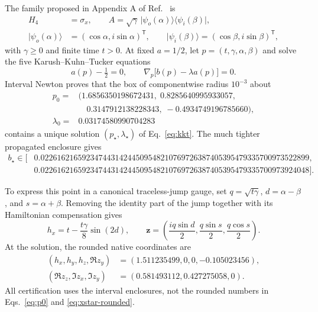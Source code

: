 \documentclass[11pt,a4paper]{article}
\newcommand{\ket}[1]{\lvert #1\rangle}
\newcommand{\bra}[1]{\langle #1\rvert}
\begin{document}
The family proposed in Appendix A of Ref.~\cite{Shahbeigi2024} is
\begin{align}
 H_4&=\sigma_x,\qquad
 A=\sqrt{\gamma}\,\ket{\psi_o(\alpha)}\!\bra{\psi_i(\beta)},\nonumber\\
 \ket{\psi_o(\alpha)}&=(\cos\alpha,i\sin\alpha)^{\mathsf T},\qquad
 \ket{\psi_i(\beta)}=(\cos\beta,i\sin\beta)^{\mathsf T},
 \label{eq:restricted}
\end{align}
with $\gamma\geq0$ and finite time $t>0$.  At fixed $a=1/2$, let
$p=(t,\gamma,\alpha,\beta)$ and solve the five Karush--Kuhn--Tucker equations
\begin{equation}
 a(p)-\tfrac12=0,\qquad
 \nabla_p\bigl[b(p)-\lambda a(p)\bigr]=0.
 \label{eq:kkt}
\end{equation}
Interval Newton proves that the box of componentwise radius $10^{-3}$ about
\begin{equation}
 \begin{aligned}
 p_0={}&(1.6856350198672431,\;0.8285640995933057,\\
       &\quad 0.3147912138228343,\;-0.4934749196785660),\\
 \lambda_0={}&0.03174580990704283
 \end{aligned}
 \label{eq:p0}
\end{equation}
contains a unique solution $(p_\star,\lambda_\star)$ of
Eq.~\eqref{eq:kkt}.  The much tighter propagated enclosure gives
\begin{align}
 b_\star\in[&0.02261621659234744314244509548210769726387405395479335700973522899,
 \nonumber\\[-2mm]
 &0.02261621659234744314244509548210769726387405395479335700973924048].
 \label{eq:bstar}
\end{align}

To express this point in a canonical traceless-jump gauge, set
$q=\sqrt{t\gamma}$, $d=\alpha-\beta$, and $s=\alpha+\beta$.  Removing the
identity part of the jump together with its Hamiltonian compensation gives
\begin{equation}
 h_x=t-\frac{t\gamma}{8}\sin(2d),\qquad
 \bm z=\left(\frac{iq\sin d}{2},
              \frac{q\sin s}{2},
              \frac{q\cos s}{2}\right).
 \label{eq:restricted-map}
\end{equation}
At the solution, the rounded native coordinates are
\begin{equation}
 \begin{aligned}
 (h_x,h_y,h_z,\Re z_y)&=(1.511235499,0,0,-0.105023456),\\
 (\Re z_z,\Im z_x,\Im z_y)&=(0.581493112,0.427275058,0).
 \end{aligned}
 \label{eq:xstar-rounded}
\end{equation}
All certification uses the interval enclosures, not the rounded numbers in
Eqs.~\eqref{eq:p0} and \eqref{eq:xstar-rounded}.
\end{document}
